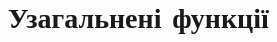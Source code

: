 

\section{Узагальнені функції}\setcounter{equation}{0}\label{sec:GeneralizedFunctions}

%

%
%
%



